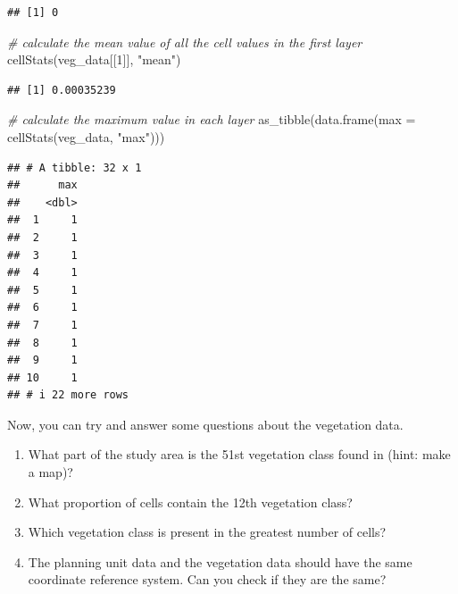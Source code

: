 \documentclass[
  12pt,
]{book}
\makeatletter
\newenvironment{Shaded}{\begin{snugshade}}{\end{snugshade}}
\newcommand{\AttributeTok}[1]{\textcolor[rgb]{0.77,0.63,0.00}{#1}}
\newcommand{\CommentTok}[1]{\textcolor[rgb]{0.56,0.35,0.01}{\textit{#1}}}
\newcommand{\DecValTok}[1]{\textcolor[rgb]{0.00,0.00,0.81}{#1}}
\newcommand{\FunctionTok}[1]{\textcolor[rgb]{0.00,0.00,0.00}{#1}}
\newcommand{\NormalTok}[1]{#1}
\newcommand{\StringTok}[1]{\textcolor[rgb]{0.31,0.60,0.02}{#1}}
\providecommand{\tightlist}{%
  \setlength{\itemsep}{0pt}\setlength{\parskip}{0pt}}
\newenvironment{kframe}{%
\medskip{}
\setlength{\fboxsep}{.8em}
 \def\at@end@of@kframe{}%
 \ifinner\ifhmode%
  \def\at@end@of@kframe{\end{minipage}}%
  \begin{minipage}{\columnwidth}%
 \fi\fi%
 \def\FrameCommand##1{\hskip\@totalleftmargin \hskip-\fboxsep
 \colorbox{shadecolor}{##1}\hskip-\fboxsep
     \hskip-\linewidth \hskip-\@totalleftmargin \hskip\columnwidth}%
 \MakeFramed {\advance\hsize-\width
   \@totalleftmargin\z@ \linewidth\hsize
   \@setminipage}}%
 {\par\unskip\endMakeFramed%
 \at@end@of@kframe}
\newenvironment{rmdblock}[1]
  {
  \begin{itemize}
  \renewcommand{\labelitemi}{
    \raisebox{-.7\height}[0pt][0pt]{
      {\setkeys{Gin}{width=3em,keepaspectratio}\texttt{[image: images/\#1]}}
    }
  }
  \setlength{\fboxsep}{1em}
  \begin{kframe}
  \item
  }
  {
  \end{kframe}
  \end{itemize}
  }
\newenvironment{rmdquestion}
  {\begin{rmdblock}{question}}
  {\end{rmdblock}}
\makeatother
\begin{document}
\begin{verbatim}
## [1] 0
\end{verbatim}

\begin{Shaded}
\begin{Highlighting}[]
\CommentTok{\# calculate the mean value of all the cell values in the first layer}
\FunctionTok{cellStats}\NormalTok{(veg\_data[[}\DecValTok{1}\NormalTok{]], }\StringTok{"mean"}\NormalTok{)}
\end{Highlighting}
\end{Shaded}

\begin{verbatim}
## [1] 0.00035239
\end{verbatim}

\clearpage

\begin{Shaded}
\begin{Highlighting}[]
\CommentTok{\# calculate the maximum value in each layer}
\FunctionTok{as\_tibble}\NormalTok{(}\FunctionTok{data.frame}\NormalTok{(}\AttributeTok{max =} \FunctionTok{cellStats}\NormalTok{(veg\_data, }\StringTok{"max"}\NormalTok{)))}
\end{Highlighting}
\end{Shaded}

\begin{verbatim}
## # A tibble: 32 x 1
##      max
##    <dbl>
##  1     1
##  2     1
##  3     1
##  4     1
##  5     1
##  6     1
##  7     1
##  8     1
##  9     1
## 10     1
## # i 22 more rows
\end{verbatim}

Now, you can try and answer some questions about the vegetation data.

\begin{rmdquestion}
\begin{enumerate}
\def\labelenumi{\arabic{enumi}.}
\tightlist
\item
  What part of the study area is the 51st vegetation class found in (hint: make a map)?
\item
  What proportion of cells contain the 12th vegetation class?
\item
  Which vegetation class is present in the greatest number of cells?
\item
  The planning unit data and the vegetation data should have the same coordinate reference system. Can you check if they are the same?
\end{enumerate}
\end{rmdquestion}
\end{document}
